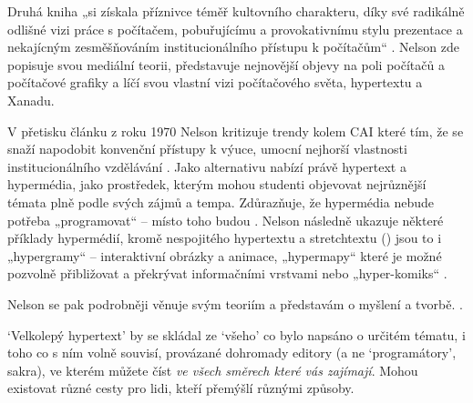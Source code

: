 Druhá kniha  „si získala příznivce téměř kultovního charakteru, díky své radikálně odlišné vizi práce s počítačem, pobuřujícímu a provokativnímu stylu prezentace a nekajícným zesměšňováním institucionálního přístupu k počítačům“ \autocite[211]{Wright2007}. Nelson zde popisuje svou mediální teorii, představuje nejnovější objevy na poli počítačů a počítačové grafiky a líčí svou vlastní vizi počítačového světa, hypertextu a Xanadu.

\label{p:dm:dirtylooks}
V přetisku článku z roku 1970  Nelson kritizuje trendy kolem CAI které tím, že se snaží napodobit konvenční přístupy k výuce, umocní nejhorší vlastnosti institucionálního vzdělávání \autocite[DM16--DM18]{Nelson1974}. Jako alternativu nabízí právě hypertext a hypermédia, jako prostředek, kterým mohou studenti objevovat nejrůznější témata plně podle svých zájmů a tempa. Zdůrazňuje, že hypermédia nebude potřeba „programovat“ -- místo toho budou . Nelson následně ukazuje některé příklady hypermédií, kromě nespojitého hypertextu a stretchtextu () jsou to i „hypergramy“ -- interaktivní obrázky a animace, „hypermapy“ které je možné pozvolně přibližovat a překrývat informačními vrstvami nebo „hyper-komiks“ \autocite[DM19]{Nelson1974}.

Nelson se pak podrobněji věnuje svým teoriím a představám o myšlení a tvorbě. .

\begin{quoted}{\autocite[DM44]{Nelson1974}}
\enquote*{Velkolepý hypertext} by se skládal ze \enquote*{všeho} co bylo napsáno o určitém tématu, i toho co s ním volně souvisí, provázané dohromady editory (a ne \enquote*{programátory}, sakra), ve kterém můžete číst \emph{ve všech směrech které vás zajímají}. Mohou existovat různé cesty pro lidi, kteří přemýšlí různými způsoby.
\end{quoted}

